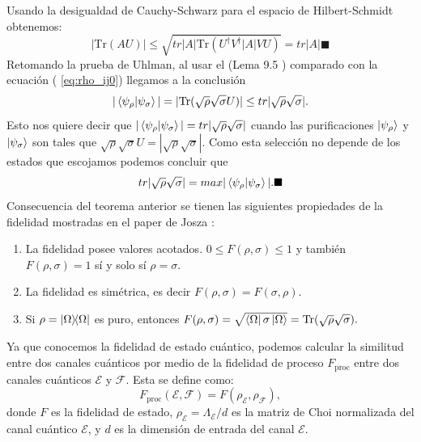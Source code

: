 \documentclass[letterpaper,12pt]{thesisECFM}
\theoremstyle{plain}
\theoremstyle{definition}
\theoremstyle{definition}
\theoremstyle{remark}
\newcommand{\1}{\mathbb{1}}
\begin{document}
    Usando la desigualdad de Cauchy-Schwarz \cite{nielsen_chuang_2011} para el espacio de Hilbert-Schmidt obtenemos:
    \begin{equation}
        |\text{Tr}(AU)| \leq \sqrt{ tr|A| \text{Tr}(U^\dagger V^ \dagger  |A|VU) } = tr|A| \blacksquare  
    \end{equation} 
    Retomando la prueba de Uhlman, al usar el (Lema 9.5 ) comparado con la ecuación ( \ref{eq:rho_ij0})  llegamos a la conclusión
    \begin{equation}
        |\braket{\psi_\rho}{\psi_\sigma}| = |\text{Tr}(\sqrt{\rho} \sqrt{\sigma} U )| \leq tr|\sqrt{\rho} \sqrt{\sigma} |.
    \end{equation}
    Esto nos quiere decir que $|\braket{\psi_\rho}{\psi_\sigma}| = tr| \sqrt{\rho}\sqrt{\sigma}|$ cuando las purificaciones $\ket{\psi_\rho}$ y $\ket{\psi_\sigma}$ son tales que $\sqrt{\rho}\sqrt{\sigma} U = |\sqrt{\rho}\sqrt{\sigma}|$. Como esta selección no depende de los estados que escojamos podemos concluir que
    \begin{equation}
        tr|\sqrt{\rho}\sqrt{\sigma}| = max | \braket{\psi_\rho}{\psi_\sigma}|. \blacksquare
    \end{equation}
    Consecuencia del teorema anterior se tienen las siguientes propiedades de la fidelidad mostradas en el paper de Josza \cite{Jozsa}:
    \begin{enumerate}
        \item La fidelidad posee valores acotados. $0 \leq F(\rho,\sigma) \leq 1$ y también $F(\rho,\sigma)=1 $ sí y solo sí $\rho=\sigma$.
	\item La fidelidad es simétrica, es decir  $F(\rho,\sigma) = F(\sigma,\rho).$
        \item Si $\rho= \ketbra{\Omega}{\Omega}$ es puro, entonces $F(\rho,\sigma)= \sqrt{\bra{\Omega}\sigma \ket{\Omega}} = \text{Tr}(\sqrt{\rho} \sqrt{\sigma}).$
    \end{enumerate}

    
Ya que conocemos la fidelidad de estado cuántico, podemos calcular la similitud entre dos canales cuánticos por medio de la  fidelidad de proceso $F_{\text{proc}}$ entre dos canales cuánticos $\mathcal{E}$ y $\mathcal{F}$. Esta se define como:
\begin{equation} \label{ec:fidel_proc}
F_{\text{proc}}(\mathcal{E}, \mathcal{F}) = F(\rho_{\mathcal{E}}, \rho_{\mathcal{F}}), 
\end{equation}
donde $F$ es la fidelidad de estado,  $\rho_{\mathcal{E}} =  \Lambda_{\mathcal{E}}/d $ es la matriz de Choi normalizada del canal cuántico $\mathcal{E}$, y $d$ es la dimensión de entrada del canal $\mathcal{E}$. 
\end{document}
